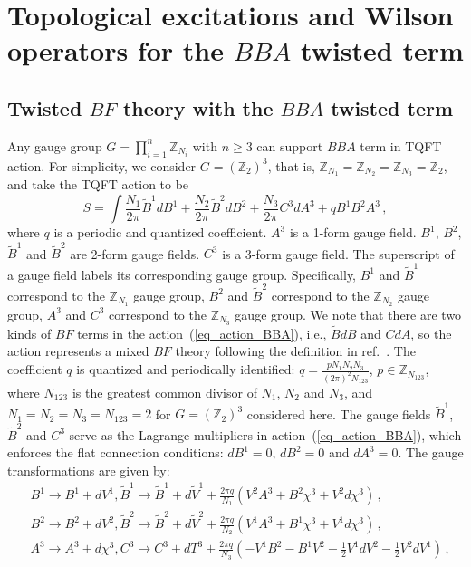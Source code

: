 \documentclass[11pt,nofootinbib,preprint]{revtex4-1}
\begin{document}
 
\section{Topological excitations and  Wilson operators for the $BBA$ twisted term}\label{s2}

\subsection{Twisted $BF$ theory with the $BBA$ twisted term}\label{ss21}
Any gauge group $G=\prod_{i=1}^n{\mathbb{Z} _{N_i}}$ with $n\geqslant3$ can support $BBA$ term in TQFT action. For simplicity, we consider $G=\left(\mathbb{Z} _{2}\right)^{3}$, that is, $\mathbb{Z}_{N_1}=\mathbb{Z}_{N_2}=\mathbb{Z}_{N_3}=\mathbb{Z} _{2}$, and take the TQFT action to be~\cite{Zhang:2021ycl}
\begin{equation}
	S=\int{\frac{N_1}{2\pi}\tilde{B}^1dB^1+}\frac{N_2}{2\pi}\tilde{B}^2dB^2+\frac{N_3}{2\pi}C^3dA^3+qB^1B^2A^3\,,
	\label{eq_action_BBA}
\end{equation}
where $q$ is a periodic and quantized coefficient. $A^3$ is a 1-form gauge field. $B^1$, $B^2$, $\tilde{B}^1$ and $\tilde{B}^2$ are 2-form gauge fields.  $C^3$ is a 3-form gauge field. The superscript of a gauge field labels its corresponding gauge group. Specifically, $B^1$ and $\tilde{B}^1$ correspond to the $\mathbb{Z} _{N_1}$ gauge group, $B^2$ and $\tilde{B}^2$ correspond to the $\mathbb{Z} _{N_2}$ gauge group, $A^3$ and $C^3$ correspond to the $\mathbb{Z} _{N_3}$ gauge group. We note that there are two kinds of $BF$ terms in the action~(\ref{eq_action_BBA}), i.e., $\tilde{B}dB$ and $CdA$, so the action represents a mixed $BF$ theory following the definition in ref.~\cite{Zhang:2021ycl}.  The coefficient $q$ is quantized and periodically identified: $q=\frac{pN_1N_2N_3}{\left( 2\pi \right) ^2N_{123}}$, $p\in \mathbb{Z} _{N_{123}}$, where $N_{123}$ is the greatest common divisor of $N_{1}$, $N_{2}$ and $N_{3}$, and  $N_{1}=N_{2}=N_{3}=N_{123}=2$ for $G=\left(\mathbb{Z} _{2}\right)^{3}$ considered here.  The gauge fields $\tilde{B}^1$, $\tilde{B}^2$ and $C^3$ serve as the Lagrange multipliers in action~(\ref{eq_action_BBA}), which enforces the flat connection conditions: $dB^1=0$, $dB^2=0$ and $dA^3=0$. The gauge transformations are given by:
\begin{align}
	&B^1\rightarrow B^1+dV^1, \tilde{B}^1\rightarrow \tilde{B}^1+d\tilde{V}^1+\frac{2\pi q}{N_1}\left( V^2A^3+B^2\chi ^3+V^2d\chi ^3 \right)\,,   
	\\
	&B^2\rightarrow B^2+dV^2, \tilde{B}^2\rightarrow \tilde{B}^2+d\tilde{V}^2+\frac{2\pi q}{N_2}\left( V^1A^3+B^1\chi ^3+V^1d\chi ^3 \right)\,,
	\\
	&A^3\rightarrow A^3+d\chi ^3, C^3\rightarrow C^3+dT^3+\frac{2\pi q}{N_3}\left( -V^1B^2-B^1V^2-\frac{1}{2}V^1dV^2-\frac{1}{2}V^2dV^1 \right) \,,\label{eq_gauge_C3}
\end{align}
\end{document}
